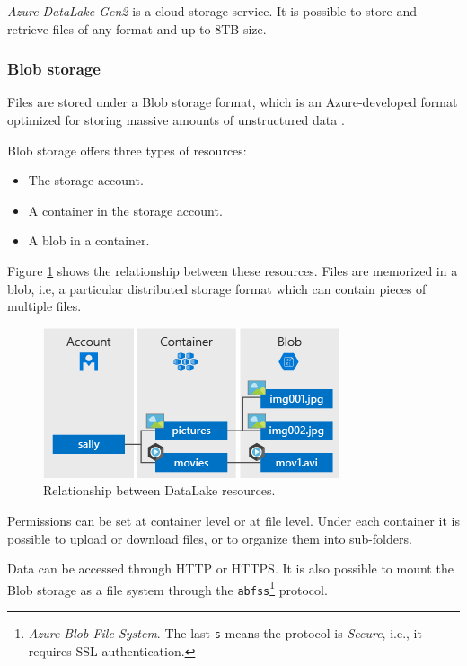 \label{section:azure:datalake}
\label{todo:datalake_description}
\textit{Azure DataLake Gen2} is a cloud storage service.
It is possible to store and retrieve files of any format and up to 8TB size.

\subsubsection{Blob storage}
    Files are stored under a Blob storage format, which is an Azure-developed format optimized for storing massive amounts of unstructured data \cite{bib:azure:datalake:intro_to_blob_storage}.
    
    Blob storage offers three types of resources:
        \begin{itemize}
            \item The storage account.
            \item A container in the storage account.
            \item A blob in a container.
        \end{itemize}

    Figure \ref{fig:azure:datalake:resources_relationship} shows the relationship between these resources.
    Files are memorized in a blob, i.e, a particular distributed storage format which can contain pieces of multiple files.
    
    \begin{figure}
        \centering
        \includegraphics[width=.5\textwidth]{res/azure/datalake/blob.png}
        \caption{Relationship between DataLake resources.}
        \label{fig:azure:datalake:resources_relationship}
    \end{figure}

    Permissions can be set at container level or at file level.
    Under each container it is possible to upload or download files, or to organize them into sub-folders.
    
    Data can be accessed through HTTP or HTTPS.
    It is also possible to mount the Blob storage as a file system through the \texttt{abfss}\footnote{
        \textit{Azure Blob File System}. The last \texttt{s} means the protocol is \textit{Secure}, i.e., it requires SSL authentication.
    } protocol.
